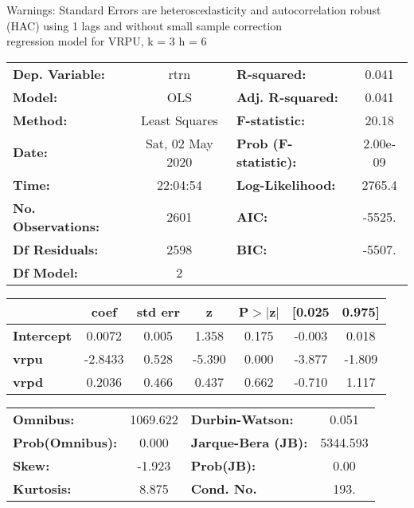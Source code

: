 Warnings: \newline
 [1] Standard Errors are heteroscedasticity and autocorrelation robust (HAC) using 1 lags and without small sample correction\\ 

regression model for VRPU, k = 3 h = 6\begin{center}
\begin{tabular}{lclc}
\toprule
\textbf{Dep. Variable:}    &       rtrn       & \textbf{  R-squared:         } &     0.041   \\
\textbf{Model:}            &       OLS        & \textbf{  Adj. R-squared:    } &     0.041   \\
\textbf{Method:}           &  Least Squares   & \textbf{  F-statistic:       } &     20.18   \\
\textbf{Date:}             & Sat, 02 May 2020 & \textbf{  Prob (F-statistic):} &  2.00e-09   \\
\textbf{Time:}             &     22:04:54     & \textbf{  Log-Likelihood:    } &    2765.4   \\
\textbf{No. Observations:} &        2601      & \textbf{  AIC:               } &    -5525.   \\
\textbf{Df Residuals:}     &        2598      & \textbf{  BIC:               } &    -5507.   \\
\textbf{Df Model:}         &           2      & \textbf{                     } &             \\
\bottomrule
\end{tabular}
\begin{tabular}{lcccccc}
                   & \textbf{coef} & \textbf{std err} & \textbf{z} & \textbf{P$> |$z$|$} & \textbf{[0.025} & \textbf{0.975]}  \\
\midrule
\textbf{Intercept} &       0.0072  &        0.005     &     1.358  &         0.175        &       -0.003    &        0.018     \\
\textbf{vrpu}      &      -2.8433  &        0.528     &    -5.390  &         0.000        &       -3.877    &       -1.809     \\
\textbf{vrpd}      &       0.2036  &        0.466     &     0.437  &         0.662        &       -0.710    &        1.117     \\
\bottomrule
\end{tabular}
\begin{tabular}{lclc}
\textbf{Omnibus:}       & 1069.622 & \textbf{  Durbin-Watson:     } &    0.051  \\
\textbf{Prob(Omnibus):} &   0.000  & \textbf{  Jarque-Bera (JB):  } & 5344.593  \\
\textbf{Skew:}          &  -1.923  & \textbf{  Prob(JB):          } &     0.00  \\
\textbf{Kurtosis:}      &   8.875  & \textbf{  Cond. No.          } &     193.  \\
\bottomrule
\end{tabular}
\end{center}

